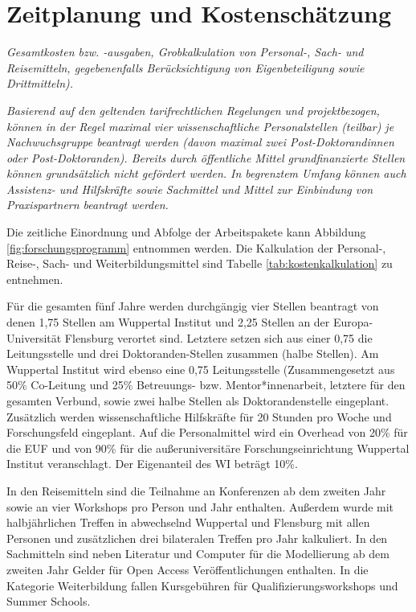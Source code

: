 \documentclass[a4paper,11pt,twoside]{scrartcl}
\begin{document}
\section{Zeitplanung und Kostenschätzung}
\textit{Gesamtkosten bzw. -ausgaben, Grobkalkulation von Personal-, Sach- und Reisemitteln, gegebenenfalls Berücksichtigung von Eigenbeteiligung sowie Drittmitteln).}

\textit{Basierend auf den geltenden tarifrechtlichen Regelungen und projektbezogen, können in der Regel maximal vier wissenschaftliche Personalstellen (teilbar) je Nachwuchsgruppe beantragt werden (davon maximal zwei Post-Doktorandinnen oder Post-Doktoranden). Bereits durch öffentliche Mittel grundfinanzierte Stellen können grundsätzlich nicht gefördert werden.
In begrenztem Umfang können auch Assistenz- und Hilfskräfte sowie Sachmittel und Mittel zur Einbindung von Praxispartnern beantragt werden.}

Die zeitliche Einordnung und Abfolge der Arbeitspakete kann Abbildung \ref{fig:forschungsprogramm} entnommen werden. Die Kalkulation der Personal-, Reise-, Sach- und Weiterbildungsmittel sind Tabelle \ref{tab:kostenkalkulation} zu entnehmen.

Für die gesamten fünf Jahre werden durchgängig vier Stellen beantragt von denen 1,75 Stellen am Wuppertal Institut und 2,25 Stellen an der Europa-Universität Flensburg verortet sind. Letztere setzen sich aus einer 0,75 die Leitungsstelle und drei Doktoranden-Stellen zusammen (halbe Stellen). Am Wuppertal Institut wird ebenso eine 0,75 Leitungsstelle (Zusammengesetzt aus 50\% Co-Leitung und 25\% Betreuungs- bzw. Mentor*innenarbeit, letztere für den gesamten Verbund, sowie zwei  halbe Stellen als Doktorandenstelle eingeplant. Zusätzlich werden wissenschaftliche Hilfskräfte für 20 Stunden pro Woche und Forschungsfeld eingeplant. Auf die Personalmittel wird ein Overhead von 20\% für die EUF und von 90\% für die außeruniversitäre Forschungseinrichtung Wuppertal Institut veranschlagt. Der Eigenanteil des WI beträgt 10\%.

In den Reisemitteln sind die Teilnahme an Konferenzen ab dem zweiten Jahr sowie an vier Workshops pro Person und Jahr enthalten. Außerdem wurde mit halbjährlichen Treffen in abwechselnd Wuppertal und Flensburg mit allen Personen und zusätzlichen drei bilateralen Treffen pro Jahr kalkuliert. In den Sachmitteln sind neben Literatur und Computer für die Modellierung ab dem zweiten Jahr Gelder für Open Access Veröffentlichungen enthalten. In die Kategorie Weiterbildung fallen Kursgebühren für Qualifizierungsworkshops und Summer Schools.
\end{document}
